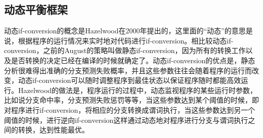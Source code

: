 \subsection{动态平衡框架}

动态if-conversion的概念是Hazelwood在2000年提出的\cite{Hazelwood00alightweight}，这里面的“动态”的意思是说，根据程序的运行情况来实时地对代码进行if-conversion。相比较动态if-conversion，之前的August的策略叫做静态if-conversion，因为所有的转换工作以及是否转换的决定已经在编译的时候就确定了。动态if-conversion的优点是，静态分析很难得出准确的分支预测失败概率，并且这些参数往往会随着程序的运行而改变，动态if-conversion可以随时调整程序到最佳状态以保证程序随时都能高效运行。Hazelwood的做法是，程序运行的过程中，动态监视程序的某些运行时参数，比如说分支命中率，分支预测失败惩罚等等，当这些参数达到某个阈值的时候，即对程序进行if-conversion，将相应的分支转换成谓词执行，当这些参数达到另一个阈值的时候，进行逆向if-conversion这样通过动态地对程序进行分支与谓词执行之间的转换，达到性能最优。